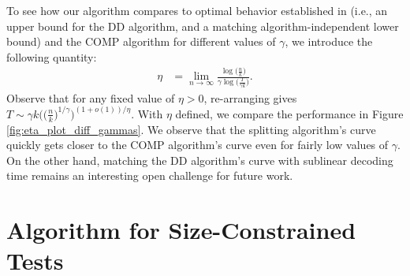 To see how our algorithm compares to optimal behavior established in \cite{Oli20} (i.e., an upper bound for the DD algorithm, and a matching algorithm-independent lower bound) and the COMP algorithm \cite{Ven19} for different values of $\gamma$, we introduce the following quantity:
\begin{align}
    \eta&=\lim_{n\rightarrow\infty}\frac{\log\big(\frac{n}{k}\big)}{\gamma\log\big(\frac{T}{\gamma k}\big)}. \label{eq:eta}
\end{align}
Observe that for any fixed value of $\eta>0$, re-arranging gives $T\sim\gamma k\big(\big(\frac{n}{k}\big)^{1/\gamma}\big)^{(1+o(1))/\eta}$. With $\eta$ defined, we compare the performance in Figure \ref{fig:eta_plot_diff_gammas}. We observe that the splitting algorithm's curve quickly gets closer to the COMP algorithm's curve even for fairly low values of $\gamma$.  On the other hand, matching the DD algorithm's curve with sublinear decoding time remains an interesting open challenge for future work.

\section{Algorithm for Size-Constrained Tests}

